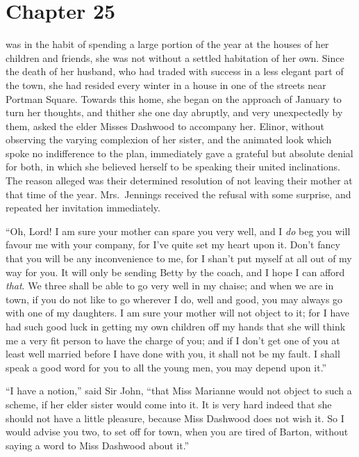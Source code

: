 \chapter{Chapter 25}


 was in the habit of spending a large
portion of the year at the houses of her children and friends,
she was not without a settled habitation of her own.
Since the death of her husband, who had traded with success
in a less elegant part of the town, she had resided every
winter in a house in one of the streets near Portman Square.
Towards this home, she began on the approach of January
to turn her thoughts, and thither she one day abruptly,
and very unexpectedly by them, asked the elder Misses
Dashwood to accompany her.  Elinor, without observing
the varying complexion of her sister, and the animated look
which spoke no indifference to the plan, immediately gave
a grateful but absolute denial for both, in which she
believed herself to be speaking their united inclinations.
The reason alleged was their determined resolution
of not leaving their mother at that time of the year.
Mrs.\ Jennings received the refusal with some surprise,
and repeated her invitation immediately.

``Oh, Lord! I am sure your mother can spare you
very well, and I \emph{do} beg you will favour me with
your company, for I've quite set my heart upon it.
Don't fancy that you will be any inconvenience to me,
for I shan't put myself at all out of my way for you.
It will only be sending Betty by the coach, and I
hope I can afford \emph{that}.  We three shall be able to go
very well in my chaise; and when we are in town,
if you do not like to go wherever I do, well and good,
you may always go with one of my daughters.  I am sure
your mother will not object to it; for I have had such
good luck in getting my own children off my hands that she
will think me a very fit person to have the charge of you;
and if I don't get one of you at least well married
before I have done with you, it shall not be my fault.
I shall speak a good word for you to all the young men,
you may depend upon it.''

``I have a notion,'' said Sir John, ``that Miss Marianne
would not object to such a scheme, if her elder sister
would come into it.  It is very hard indeed that she
should not have a little pleasure, because Miss Dashwood
does not wish it.  So I would advise you two, to set off
for town, when you are tired of Barton, without saying
a word to Miss Dashwood about it.''

